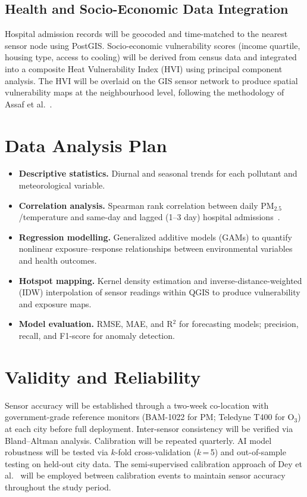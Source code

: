 \documentclass[12pt,a4paper]{report}
\begin{document}
\subsection{Health and Socio-Economic Data Integration}
Hospital admission records will be geocoded and time-matched to the nearest sensor node using PostGIS. Socio-economic vulnerability scores (income quartile, housing type, access to cooling) will be derived from census data and integrated into a composite Heat Vulnerability Index (HVI) using principal component analysis. The HVI will be overlaid on the GIS sensor network to produce spatial vulnerability maps at the neighbourhood level, following the methodology of Assaf et al.~\cite{assaf2023}.

\section{Data Analysis Plan}
\begin{itemize}[leftmargin=*, itemsep=4pt]
  \item \textbf{Descriptive statistics.} Diurnal and seasonal trends for each pollutant and meteorological variable.
  \item \textbf{Correlation analysis.} Spearman rank correlation between daily PM$_{2.5}$/temperature and same-day and lagged (1--3 day) hospital admissions~\cite{toure2024}.
  \item \textbf{Regression modelling.} Generalized additive models (GAMs) to quantify nonlinear exposure--response relationships between environmental variables and health outcomes.
  \item \textbf{Hotspot mapping.} Kernel density estimation and inverse-distance-weighted (IDW) interpolation of sensor readings within QGIS to produce vulnerability and exposure maps.
  \item \textbf{Model evaluation.} RMSE, MAE, and R$^2$ for forecasting models; precision, recall, and F1-score for anomaly detection.
\end{itemize}

\section{Validity and Reliability}
Sensor accuracy will be established through a two-week co-location with government-grade reference monitors (BAM-1022 for PM; Teledyne T400 for O$_3$) at each city before full deployment. Inter-sensor consistency will be verified via Bland--Altman analysis. Calibration will be repeated quarterly. AI model robustness will be tested via $k$-fold cross-validation ($k$\,=\,5) and out-of-sample testing on held-out city data. The semi-supervised calibration approach of Dey et al.~\cite{dey2022} will be employed between calibration events to maintain sensor accuracy throughout the study period.
\end{document}
